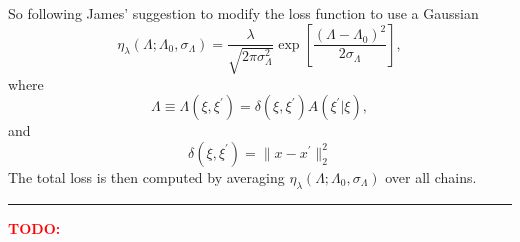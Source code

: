 \documentclass[11pt]{article}
\begin{document}
\noindent
So following James’ suggestion to modify the loss function to use a Gaussian
\begin{equation}
\eta_{\lambda}(\Lambda; \Lambda_{0}, \sigma_{\Lambda}) =
    \frac{\lambda}{\sqrt{2 \pi \sigma_{\Lambda}^{2}}}
        \exp\left[\frac{(\Lambda - \Lambda_{0})^{2}}{2\sigma_{\Lambda}}\right],
\end{equation}
where    
\begin{equation}
    \Lambda \equiv \Lambda(\xi, \xi^{\prime}) = \delta(\xi, \xi^{\prime}) A(\xi^{\prime}|\xi),
\end{equation}
and    
\begin{equation}
    \delta(\xi, \xi^{\prime}) = \|x - x^{\prime}\|_{2}^{2}
\end{equation}
The total loss is then computed by averaging $\eta_{\lambda}(\Lambda; \Lambda_{0}, \sigma_{\Lambda})$ over all chains.
\newline
\noindent\rule{4cm}{0.4pt}
\newline
\newline
\newline
\noindent
\textbf{\textcolor{red}{\huge TODO:}}\\
\end{document}
